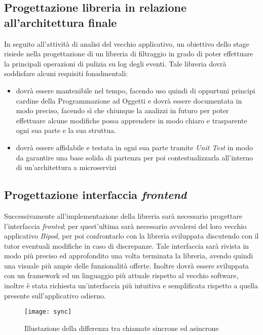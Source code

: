 \subsection{Progettazione libreria in relazione all'architettura finale}
In seguito all'attività di analisi del vecchio applicativo, un obiettivo dello stage risiede nella progettazione di un libreria di filtraggio in grado di poter effettuare la principali operazioni di pulizia su log degli eventi. Tale libreria dovrà soddisfare alcuni requisiti fonadmentali:
\begin{itemize}
	\item dovrà essere mantenibile nel tempo, facendo uso quindi di oppurtuni principi cardine della Programmazione ad Oggetti e dovrà essere documentata in modo preciso, facendo sì che chiunque la analizzi in futuro per poter effettuare alcune modifiche possa apprendere in modo chiaro e trasparente ogni sua parte e la sua struttua.
	\item dovrà essere affidabile e testata in ogni sua parte tramite \textit{Unit Test} in modo da garantire una base solida di partenza per poi contestualizzarla all'interno di un'architettura a microservizi
\end{itemize}
\subsection{Progettazione interfaccia \textit{frontend}}
Successivamente all'implementazione della libreria sarà necessario progettare l'interfaccia \textit{fronted}; per quest'ultima sarà necessario avvalersi del loro vecchio applicativo \textit{Bipod}, per poi confrontarlo con la libreria sviluppata discutendo con il tutor eventuali modifiche in caso di discrepanze. Tale interfaccia sarà rivista in modo più preciso ed approfondito una volta terminata la libreria, avendo quindi una visuale più ampie delle funzionalità offerte. Inoltre dovrà essere sviluppata con un framework ed un linguaggio più attuale rispetto al vecchio software, inoltre è stata richiesta un'interfaccia più intuitiva e semplificata rispetto a quella presente sull'applicativo odierno.
\begin{figure}[!h] 
	\centering 
	\texttt{[image: sync]} 
	\caption{Illustazione della differenza tra chiamate sincrone ed asincrone}
\end{figure}
\newpage
